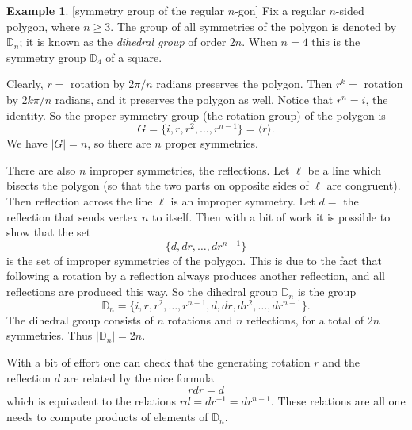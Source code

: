 \documentclass[11pt]{article}
\theoremstyle{definition}
\newtheorem{example}[thm]{Example}
\newcommand{\gen}[1]{\langle #1 \rangle}
\newcommand{\D}{\mathbb{D}}
\begin{document}
\begin{example}\label{ex:dihedral}[symmetry group of the regular $n$-gon]
Fix a regular $n$-sided polygon, where $n \ge 3$. The group of all
symmetries of the polygon is denoted by $\D_n$\index{D@$\D_n$}; it is
known as the {\em dihedral group} of order
$2n$. When $n=4$ this is the symmetry group $\D_4$ of a square.

Clearly, $r=$ rotation by $2\pi/n$ radians preserves the 
polygon. Then $r^k =$ rotation by $2k\pi/n$ radians, and it preserves
the polygon as well. Notice that $r^n = i$, the identity.
So the proper symmetry group (the rotation group) of the polygon is
\[
  G = \{ i, r, r^2, \dots, r^{n-1 }\} = \gen{r}.
\]
We have $|G| = n$, so there are $n$ proper symmetries. 

There are also $n$ improper symmetries, the reflections. Let $\ell$ be
a line which bisects the polygon (so that the two parts on opposite
sides of $\ell$ are congruent). Then reflection across the line $\ell$
is an improper symmetry. Let $d = $ the reflection that sends
vertex $n$ to itself. Then with a bit of work it is possible to show
that the set 
\[
  \{d, dr, \dots, d r^{n-1}\}
\]
is the set of improper symmetries of the polygon. This is due to the
fact that following a rotation by a reflection always produces another
reflection, and all reflections are produced this way.  So the
dihedral group $\D_n$ is the group
\[
  \D_n = \{ i, r, r^2, \dots, r^{n-1}, d, dr, dr^2, \dots, d r^{n-1}
  \}.
\]
The dihedral group consists of $n$ rotations and $n$ reflections, for
a total of $2n$ symmetries. Thus $|\D_n| = 2n$. 

With a bit of effort one can check that the generating rotation $r$
and the reflection $d$ are related by the nice formula $$r d r = d$$
which is equivalent to the relations $rd = d r^{-1} = d
r^{n-1}$. These relations are all one needs to compute products of
elements of $\D_n$.
\end{example}
\end{document}
